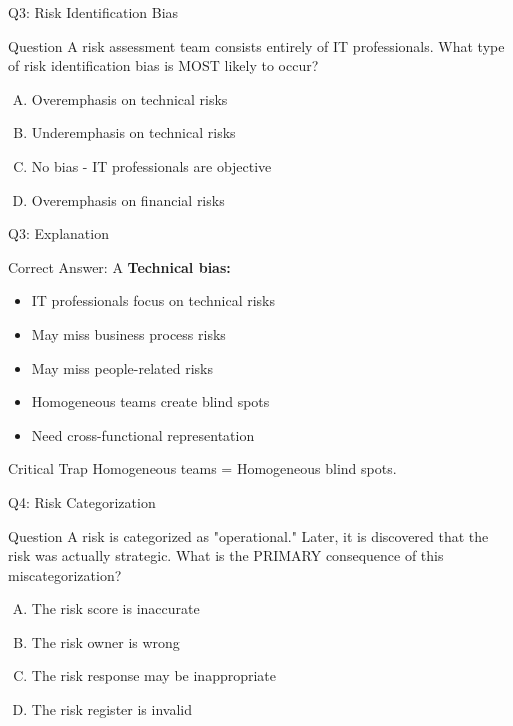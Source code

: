 \documentclass{beamer}
\begin{document}
			\begin{frame}{Q3: Risk Identification Bias}
				\begin{block}{Question}
					A risk assessment team consists entirely of IT professionals. What type of risk identification bias is MOST likely to occur?
				\end{block}
				\begin{enumerate}[(A)]
					\item Overemphasis on technical risks
					\item Underemphasis on technical risks
					\item No bias - IT professionals are objective
					\item Overemphasis on financial risks
				\end{enumerate}
			\end{frame}
			
			\begin{frame}{Q3: Explanation}
				\begin{block}{Correct Answer: A}
					\textbf{Technical bias:}
					\begin{itemize}
						\item IT professionals focus on technical risks
						\item May miss business process risks
						\item May miss people-related risks
						\item Homogeneous teams create blind spots
						\item Need cross-functional representation
					\end{itemize}
				\end{block}
				\begin{alertblock}{Critical Trap}
					Homogeneous teams = Homogeneous blind spots.
				\end{alertblock}
			\end{frame}
			
			\begin{frame}{Q4: Risk Categorization}
				\begin{block}{Question}
					A risk is categorized as "operational." Later, it is discovered that the risk was actually strategic. What is the PRIMARY consequence of this miscategorization?
				\end{block}
				\begin{enumerate}[(A)]
					\item The risk score is inaccurate
					\item The risk owner is wrong
					\item The risk response may be inappropriate
					\item The risk register is invalid
				\end{enumerate}
			\end{frame}
			
\end{document}
